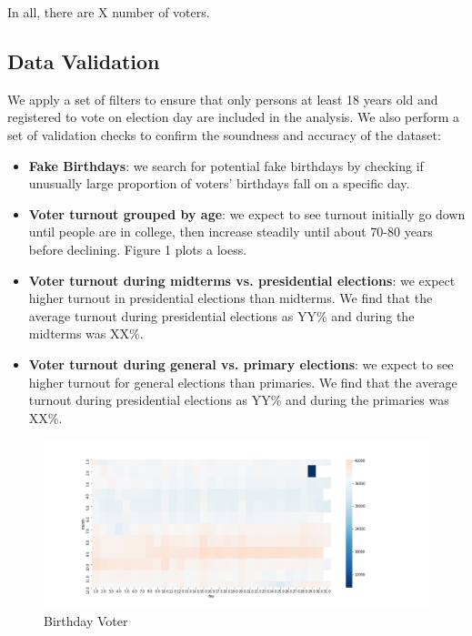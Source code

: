 \documentclass[12pt, letterpaper]{article}
\begin{document}
In all, there are X number of voters. 

\subsection{Data Validation}

We apply a set of filters to ensure that only persons at least 18 years old and registered to vote on election day are included in the analysis. We also perform a set of validation checks to confirm the soundness and accuracy of the dataset: 

\begin{itemize}

	\item \textbf{Fake Birthdays}: we search for potential fake birthdays by checking if unusually large proportion of voters' birthdays fall on a specific day.

	\item \textbf{Voter turnout grouped by age}: we expect to see turnout initially go down until people are in college, then increase steadily until about 70-80 years before declining. Figure 1 plots a loess.  

	\item \textbf{Voter turnout during midterms vs. presidential elections}: we expect higher turnout in presidential elections than midterms. We find that the average turnout during presidential elections as YY\% and during the midterms was XX\%. 

	\item \textbf{Voter turnout during general vs. primary elections}: we expect to see higher turnout for general elections than primaries. We find that the average turnout during presidential elections as YY\% and during the primaries was XX\%. 

\end{itemize}

\begin{figure}[H]
\centering
 \includegraphics[width=\textwidth]{../figs/fig2_bday_count_by_month_day.png}
 \caption{Birthday Voter}
 \label{fig:birthday}
\end{figure}
\end{document}
